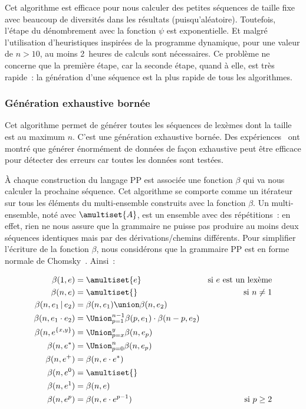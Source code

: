 Cet algorithme est efficace pour nous calculer des petites séquences de taille
fixe avec beaucoup de diversités dans les résultats (puisqu'aléatoire).
Toutefois, l'étape du dénombrement avec la fonction $\psi$ est exponentielle. Et
malgré l'utilisation d'heuristiques inspirées de la programme dynamique, pour
une valeur de $n > 10$, au moins 2~heures de calculs sont nécessaires. Ce
problème ne concerne que la première étape, car la seconde étape, quand à elle,
est très rapide~: la génération d'une séquence est la plus rapide de tous les
algorithmes.

\subsubsection{Génération exhaustive bornée}
\label{subsection:data:bounded_exhaustive_generation}

Cet algorithme permet de générer toutes les séquences de lexèmes dont la taille
est au maximum $n$. C'est une génération exhaustive bornée. Des
expériences~ ont montré que générer énormément
de données de façon exhaustive peut être efficace pour détecter des erreurs car
toutes les données sont testées.

À chaque construction du langage PP est associée une fonction $\beta$ qui va
nous calculer la prochaine séquence. Cet algorithme se comporte comme un
itérateur sur tous les éléments du multi-ensemble construits avec la fonction
$\beta$. Un multi-ensemble, noté avec $\amultiset{A}$, est un ensemble avec des
répétitions~: en effet, rien ne nous assure que la grammaire ne puisse pas
produire au moins deux séquences identiques mais par des dérivations/chemins
différents. Pour simplifier l'écriture de la fonction $\beta$, nous considérons
que la grammaire PP est en forme normale de Chomsky~. Ainsi~:

\begin{align*}
%
\beta(1, e) & =
    \amultiset{e}
    &
    \text{si $e$ est un lexème}
    \\
%
\beta(n, e) & =
    \amultiset{}
    &
    \text{si $n \neq 1$}
    \\
%
\beta(n, e_1 \,\vert\, e_2) & =
    \beta(n, e_1) \union \beta(n, e_2)
    \\
%
\beta(n, e_1 \cdot e_2) & =
    \Union_{p = 1}^{n - 1}
    \beta(p, e_1) \cdot \beta(n - p, e_2)
    \\
%
\beta(n, e^{\{x, y\}}) & =
    \Union_{p = x}^y \beta(n, e_p)
    \\
%
\beta(n, e^*) & =
    \Union_{p = 0}^n \beta(n, e_p)
    \\
%
\beta(n, e^+) & =
    \beta(n, e \cdot e^*)
    \\
%
\beta(n, e^0) & =
    \amultiset{}
    \\
%
\beta(n, e^1) & =
    \beta(n, e)
    \\
%
\beta(n, e^p) & =
    \beta(n, e \cdot e^{p - 1})
    &
    \text{si $p \geq 2$}
%
\end{align*}


